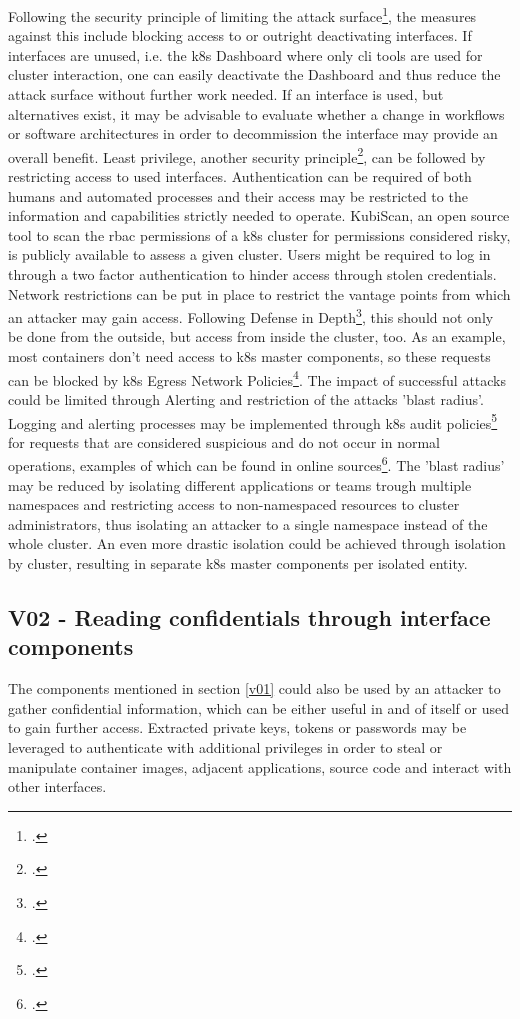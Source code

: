 Following the security principle of limiting the attack surface\footcite[][, p. 4 to 5]{k8sBook}, the measures against this include blocking access to or outright deactivating interfaces. If interfaces are unused, i.e. the \gls{k8s} Dashboard where only \gls{cli} tools are used for cluster interaction, one can easily deactivate the Dashboard and thus reduce the attack surface without further work needed. If an interface is used, but alternatives exist, it may be advisable to evaluate whether a change in workflows or software architectures in order to decommission the interface may provide an overall benefit.
Least privilege, another security principle\footcite[][, p. 3 to 4]{k8sBook}, can be followed by restricting access to used interfaces. Authentication can be required of both humans and automated processes and their access may be restricted to the information and capabilities strictly needed to operate. KubiScan, an open source tool to scan the \gls{rbac} permissions of a \gls{k8s} cluster for permissions considered risky, is publicly available to assess a given cluster. Users might be required to log in through a two factor authentication to hinder access through stolen credentials. Network restrictions can be put in place to restrict the vantage points from which an attacker may gain access.
Following Defense in Depth\footcite[][, p. 3]{k8sBook}, this should not only be done from the outside, but access from inside the cluster, too. As an example, most containers don't need access to \gls{k8s} master components, so these requests can be blocked by \gls{k8s} Egress Network Policies\footcite[][, section 'The NetworkPolicy Resource']{egressNetPol}. The impact of successful attacks could be limited through Alerting and restriction of the attacks 'blast radius'. Logging and alerting processes may be implemented through \gls{k8s} audit policies\footcite[][, section 'Audit Policy']{auditPolicy} for requests that are considered suspicious and do not occur in normal operations, examples of which can be found in online sources\footcite[][, section 'Alerting on the Kubernetes infrastructure']{sysdigMonitoring}. The 'blast radius' may be reduced by isolating different applications or teams trough multiple namespaces and restricting access to non-namespaced resources to cluster administrators, thus isolating an attacker to a single namespace instead of the whole cluster. An even more drastic isolation could be achieved through isolation by cluster, resulting in separate \gls{k8s} master components per isolated entity.

\subsection{V02 - Reading confidentials through interface components}
The components mentioned in section \ref{v01} could also be used by an attacker to gather confidential information, which can be either useful in and of itself or used to gain further access. Extracted private keys, tokens or passwords  may be leveraged to authenticate with additional privileges in order to steal or manipulate container images, adjacent applications, source code and interact with other interfaces.


